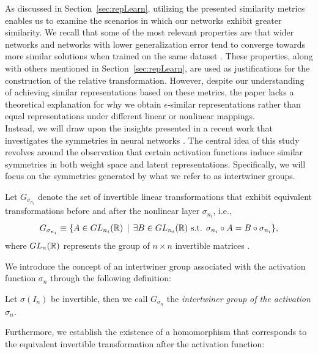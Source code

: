 \documentclass[../main.tex]{subfiles}
\begin{document}
As discussed in Section~\ref{sec:repLearn}, utilizing the presented similarity metrics enables us to examine the scenarios in which our networks exhibit greater similarity. We recall that some of the most relevant properties are that wider networks and networks with lower generalization error tend to converge towards more similar solutions when trained on the same dataset \cite{morcos_insights_2018}. These properties, along with others mentioned in Section~\ref{sec:repLearn}, are used as justifications for the construction of the relative transformation. However, despite our understanding of achieving similar representations based on these metrics, the paper lacks a theoretical explanation for why we obtain $\epsilon$-similar representations rather than equal representations under different linear or nonlinear mappings.\\

Instead, we will draw upon the insights presented in a recent work that investigates the symmetries in neural networks \cite{godfrey_symmetries_2023}. The central idea of this study revolves around the observation that certain activation functions induce similar symmetries in both weight space and latent representations. Specifically, we will focus on the symmetries generated by what we refer to as intertwiner groups.

Let $G_{\sigma_{n_i}}$ denote the set of invertible linear transformations that exhibit equivalent transformations before and after the nonlinear layer $\sigma_{n_i}$, i.e.,
\begin{equation*}
    G_{\sigma_{n_i}} \equiv \{A \in GL_{n_i}(\mathbb{R}) \, \mid \, \exists B\in
  GL_{n_i}(\mathbb{R})  \text{ s.t. } \sigma_{n_i} \circ A = B \circ \sigma_{n_i} \},
\end{equation*}
where $GL_{n}(\mathbb{R})$ represents the group of $n \times n$ invertible matrices \cite{godfrey_symmetries_2023}.

We introduce the concept of an intertwiner group associated with the activation function $\sigma_n$ through the following definition:

\begin{definition}
  \label{def:intertwiner}
  Let $\sigma(I_n)$ be invertible, then we call $G_{\sigma_n}$ the \emph{intertwiner group of the activation $\sigma_n$}. 
\end{definition}

Furthermore, we establish the existence of a homomorphism that corresponds to the equivalent invertible transformation after the activation function:
\end{document}
